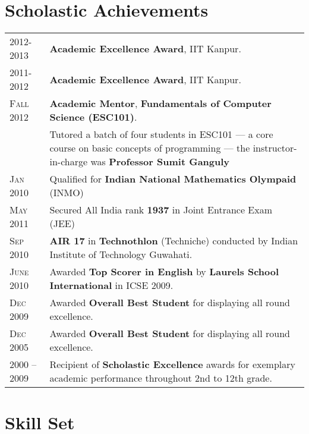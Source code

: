 \documentclass[a4paper,10pt]{article} %
\begin{document}
\section{Scholastic Achievements}

\begin{tabular}{>{\raggedleft}p{2.2cm}p{14cm}}

    \textsc{2012-2013}   & \textbf{Academic Excellence Award}, IIT Kanpur. \\
    \textsc{2011-2012}   & \textbf{Academic Excellence Award}, IIT Kanpur. \\
    \textsc{Fall 2012}   & \textbf{Academic Mentor}, \textbf{Fundamentals of Computer Science (ESC101)}. \\
                         & \footnotesize{Tutored a batch of four students in ESC101 --- a core course on
                            basic concepts of programming --- the instructor-in-charge was \textbf{Professor
                            Sumit Ganguly}}\\
    \textsc{Jan 2010}    & Qualified for \textbf{Indian National Mathematics Olympaid} (INMO) \\
    \textsc{May 2011}    & Secured All India rank \textbf{1937} in Joint Entrance Exam (JEE) \\
    \textsc{Sep 2010}    & \textbf{AIR 17} in \textbf{Technothlon} (Techniche) conducted by Indian Institute of Technology Guwahati. \\
    \textsc{June 2010}   & Awarded \textbf{Top Scorer in English} by \textbf{Laurels School International} in ICSE 2009. \\
    \textsc{Dec 2009}    & Awarded \textbf{Overall Best Student} for displaying all round excellence. \\
    \textsc{Dec 2005}    & Awarded \textbf{Overall Best Student} for displaying all round excellence. \\
    \textsc{2000 -- 2009} & Recipient of \textbf{Scholastic Excellence} awards for exemplary academic
                           performance throughout 2nd to 12th grade. \\

\end{tabular}

\section{Skill Set}
\end{document}
